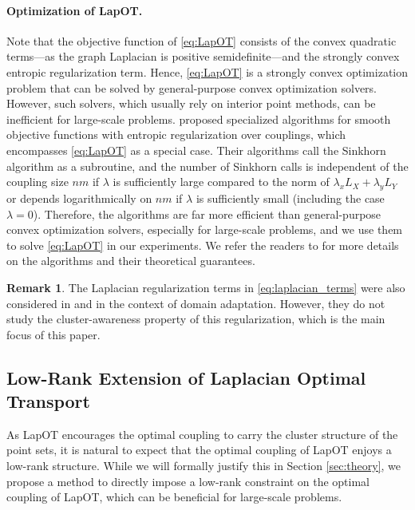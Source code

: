 \documentclass{article}
\theoremstyle{definition}
\newtheorem{remark}{Remark}
\begin{document}
\paragraph{Optimization of LapOT.}
Note that the objective function of \eqref{eq:LapOT} consists of the convex quadratic terms---as the graph Laplacian is positive semidefinite---and the strongly convex entropic regularization term. Hence, \eqref{eq:LapOT} is a strongly convex optimization problem that can be solved by general-purpose convex optimization solvers. However, such solvers, which usually rely on interior point methods, can be inefficient for large-scale problems. \cite{hur2024convexified} proposed specialized algorithms for smooth objective functions with entropic regularization over couplings, which encompasses \eqref{eq:LapOT} as a special case. Their algorithms call the Sinkhorn algorithm as a subroutine, and the number of Sinkhorn calls is independent of the coupling size $n m$ if $\lambda$ is sufficiently large compared to the norm of $\lambda_x L_X + \lambda_y L_Y$ or depends logarithmically on $n m$ if $\lambda$ is sufficiently small (including the case $\lambda = 0$). Therefore, the algorithms are far more efficient than general-purpose convex optimization solvers, especially for large-scale problems, and we use them to solve \eqref{eq:LapOT} in our experiments. We refer the readers to \cite{hur2024convexified} for more details on the algorithms and their theoretical guarantees.

\begin{remark}
    The Laplacian regularization terms in \eqref{eq:laplacian_terms} were also considered in \cite{ferradans2014regularized} and \cite{courty2016optimal} in the context of domain adaptation. However, they do not study the cluster-awareness property of this regularization, which is the main focus of this paper. 
\end{remark}


\subsection{Low-Rank Extension of Laplacian Optimal Transport}
\label{sec:low_rank_LapOT}
As LapOT encourages the optimal coupling to carry the cluster structure of the point sets, it is natural to expect that the optimal coupling of LapOT enjoys a low-rank structure. While we will formally justify this in Section \ref{sec:theory}, we propose a method to directly impose a low-rank constraint on the optimal coupling of LapOT, which can be beneficial for large-scale problems. 
\end{document}
